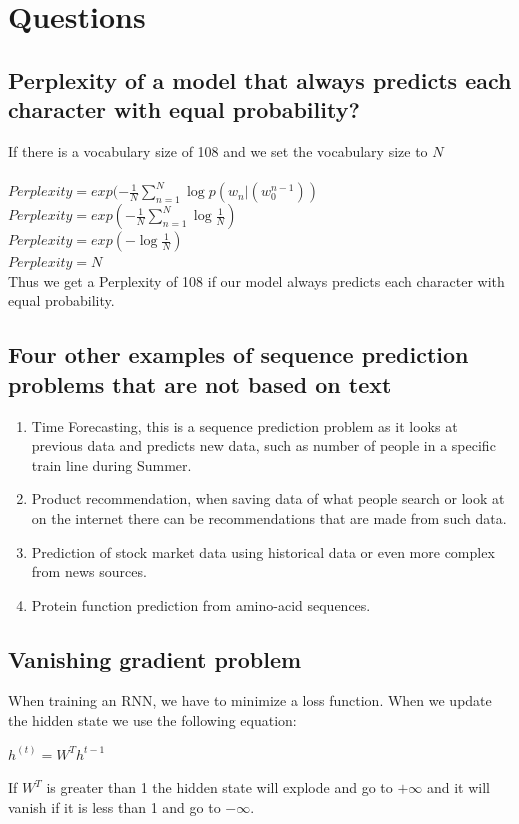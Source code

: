 \documentclass{article}
\begin{document}
\section{Questions}
\subsection{Perplexity of a model that always predicts each character with equal probability?}
If there is a vocabulary size of 108 and we set the vocabulary size to $N$\\\\
$Perplexity = exp(-\frac{1}{N}\sum_{n=1}^{N}\log p(w_{n}|(w_{0}^{n-1}))$\\
$Perplexity = exp(-\frac{1}{N}\sum_{n=1}^{N}\log \frac{1}{N})$\\
$Perplexity = exp(-\log \frac{1}{N})$\\
$Perplexity = N$\\
Thus we get a Perplexity of 108 if our model always predicts each character with equal probability.
\subsection{Four other examples of sequence prediction problems that are not based on text}
\begin{enumerate}
    \item Time Forecasting, this is a sequence prediction problem as it looks at previous data and predicts new data, such as number of people in a specific train line during Summer.
    \item Product recommendation, when saving data of what people search or look at on the internet there can be recommendations that are made from such data.
    \item Prediction of stock market data using historical data or even more complex from news sources.
    \item Protein function prediction from amino-acid sequences.
\end{enumerate}
\subsection{Vanishing gradient problem}
When training an RNN, we have to minimize a loss function. When we update the hidden state we use the following equation:\\
\begin{center}
    $h^{(t)} = W^{T}h^{t-1}$
\end{center}
If $W^{T}$ is greater than 1 the hidden state will explode and go to $+\infty$ and it will vanish if it is less than 1 and go to $-\infty$.
\end{document}

